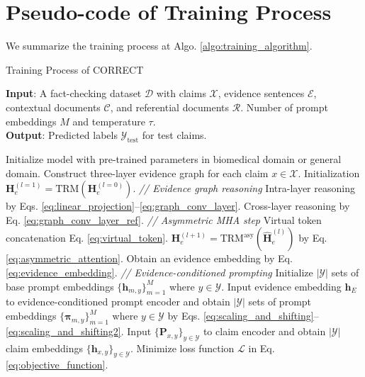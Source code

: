 \section{Pseudo-code of Training Process}
\label{sec:algorithm}

We summarize the training process at Algo. \ref{algo:training_algorithm}.

\begin{algorithm}[h]
	\caption{Training Process of CORRECT}
	\label{algo:training_algorithm}
	\begin{flushleft}
		\hspace*{\algorithmicindent}\textbf{Input}: A fact-checking dataset $ \mathcal{D} $ with claims $ \mathcal{X} $, evidence sentences $ \mathcal{E} $, contextual documents $ \mathcal{C} $, and referential documents $ \mathcal{R} $. Number of prompt embeddings $ M $ and temperature $ \tau $. \\
		\hspace*{\algorithmicindent}\textbf{Output}: Predicted labels $ \widehat{\mathcal{Y}}_{\text{test}} $ for test claims.
	\end{flushleft} 
	\begin{algorithmic}[1] %
		\State Initialize model with pre-trained parameters in biomedical domain or general domain.
        \State Construct three-layer evidence graph for each claim $ x\in\mathcal{X} $.
            \State Initialization $ \textbf{H}_e^{(l=1)}=\text{TRM}(\textbf{H}_e^{(l=0)}) $.
                \Statex \qquad\qquad\textit{ // Evidence graph reasoning}
                \State Intra-layer reasoning by Eqs. \ref{eq:linear_projection}--\ref{eq:graph_conv_layer}.
                \State Cross-layer reasoning by Eq. \ref{eq:graph_conv_layer_ref}.
                \Statex \qquad\qquad\textit{ // Asymmetric MHA step}
                \State Virtual token concatenation Eq. \ref{eq:virtual_token}.
                \State $ \textbf{H}_e^{(l+1)}=\text{TRM}^{\text{asy}}(\widehat{\textbf{H}}_e^{(l)}) $ by Eq. \ref{eq:asymmetric_attention}.
                \EndFor
            \EndFor
        \State Obtain an evidence embedding by Eq. \ref{eq:evidence_embedding}.
        \Statex \quad\textit{ // Evidence-conditioned prompting}
        \State Initialize $ |\mathcal{Y}| $ sets of base prompt embeddings $ \{\textbf{h}_{m,y}\}_{m=1}^M $ where $ y\in\mathcal{Y} $.
        \State Input evidence embedding $ \textbf{h}_E $ to evidence-conditioned prompt encoder and obtain $ |\mathcal{Y}| $ sets of prompt embeddings $ \{\bm{\pi}_{m,y}\}_{m=1}^M $ where $ y\in\mathcal{Y} $ by Eqs. \ref{eq:scaling_and_shifting}--\ref{eq:scaling_and_shifting2}.
        \State Input $ \{\textbf{P}_{x,y}\}_{y\in\mathcal{Y}} $ to claim encoder and obtain $ |\mathcal{Y}| $ claim embeddings $ \{\textbf{h}_{x,y}\}_{y\in\mathcal{Y}} $.
        \State Minimize loss function $ \mathcal{L} $ in Eq. \ref{eq:objective_function}.
    \EndWhile
	\end{algorithmic}
\end{algorithm}
